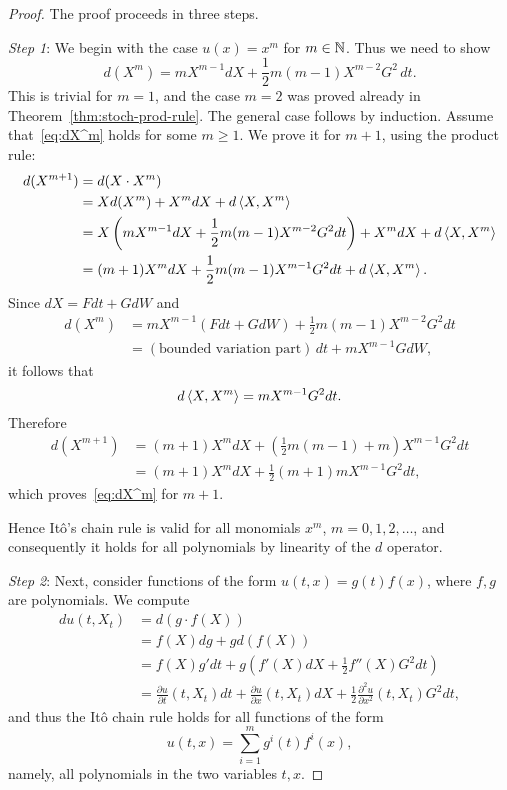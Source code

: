 \begin{proof}
The proof proceeds in three steps.

    \emph{Step 1}: We begin with the case $u(x)=x^m$ for $m\in\mathbb{N}$. Thus we need to show
    \begin{equation}
    \label{eq:dX^m}
        d(X^m) = mX^{m-1}dX + \frac{1}{2}m(m-1)X^{m-2}G^2\,dt.
    \end{equation}
    This is trivial for $m=1$, and the case $m=2$ was proved already in Theorem~\ref{thm:stoch-prod-rule}. The general case follows by induction. Assume that~\eqref{eq:dX^m} holds for some $m\ge 1$. We prove it for $m+1$, using the product rule:
    \begin{align*}
        d(X^{m+1}) &= d(X\cdot X^m) \\
        &= Xd(X^m) + X^m dX + d\braket{X,X^m} \\
        &= X\left(mX^{m-1}dX + \frac{1}{2}m(m-1)X^{m-2}G^2dt\right) + X^m dX + d\braket{X,X^m} \\
        &= (m+1)X^m dX + \frac{1}{2}m(m-1)X^{m-1}G^2dt + d\braket{X,X^m}.
    \end{align*}
    Since $dX=Fdt+GdW$ and
    \begin{align*}
        d(X^m) &= mX^{m-1}(Fdt+GdW) + \frac{1}{2}m(m-1)X^{m-2}G^2dt \\
        &= (\text{bounded variation part})\,dt + mX^{m-1}GdW,
    \end{align*}
    it follows that
    \begin{equation*}
        d\braket{X,X^m} = mX^{m-1}G^2dt.
    \end{equation*}
    Therefore
    \begin{align*}
        d(X^{m+1}) &= (m+1)X^m dX + \left(\frac{1}{2}m(m-1)+m\right)X^{m-1}G^2 dt \\
        &= (m+1)X^m dX + \frac{1}{2}(m+1)m X^{m-1}G^2 dt,
    \end{align*}
    which proves~\eqref{eq:dX^m} for $m+1$.

    Hence It\^{o}'s chain rule is valid for all monomials $x^m$, $m=0,1,2,\ldots$, and consequently it holds for all polynomials by linearity of the $d$ operator.

    \emph{Step 2}: Next, consider functions of the form $u(t,x)=g(t)f(x)$, where $f,g$ are polynomials. We compute
    \begin{align*}
        du(t,X_t) &= d(g\cdot f(X)) \\
        &= f(X)dg + gd(f(X)) \\
        &= f(X)g'dt + g\left(f'(X)dX + \frac{1}{2}f''(X)G^2dt\right) \\
        &= \frac{\partial u}{\partial t}(t,X_t)dt + \frac{\partial u}{\partial x}(t,X_t)dX + \frac{1}{2}\frac{\partial^2 u}{\partial x^2}(t,X_t)G^2dt,
    \end{align*}
    and thus the It\^{o} chain rule holds for all functions of the form
    \begin{equation*}
        u(t,x) = \sum_{i=1}^m g^i(t)f^i(x),
    \end{equation*}
    namely, all polynomials in the two variables $t,x$.


\end{proof}
